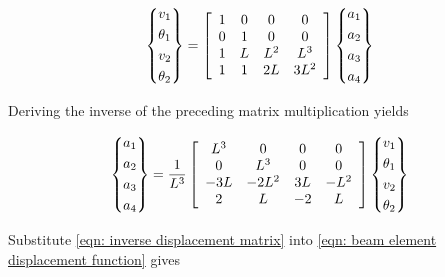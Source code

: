 \documentclass[
10pt,
a4paper,
openany,
svgnames,
]{book}
\begin{document}
\[\left\{ \begin{gathered}
  v_1 \hfill \\
  \theta _1 \hfill \\
  v_2 \hfill \\
  \theta _2 \hfill \\ 
\end{gathered}  \right\} = \left[ {\begin{array}{*{20}{c}}
  1 &0 &0   &0 \\ 
  0 &1 &0   &0 \\ 
  1 &L &L^2 &L^3 \\ 
  1 &1 &2L  &3L^2 
\end{array}} \right]\left\{ \begin{gathered}
  a_1 \hfill \\
  a_2 \hfill \\
  a_3 \hfill \\
  a_4 \hfill \\ 
\end{gathered}  \right\}\]

Deriving the inverse of the preceding matrix multiplication yields

\begin{equation} \label{eqn: inverse displacement matrix}
  \left\{
    \begin{gathered}
      a_1 \hfill \\
      a_2 \hfill \\
      a_3 \hfill \\
      a_4 \hfill \\ 
    \end{gathered}  \right\} = \frac{1}{L^3}\left[{
      \begin{array}{*{20}{c}}
        L^3 &0     &0  &0 \\ 
        0   &L^3   &0  &0 \\ 
        -3L &-2L^2 &3L &-L^2 \\ 
        2   &L     &-2 &L 
      \end{array}} \right]\left\{
    \begin{gathered}
      v_1 \hfill \\
      \theta_1 \hfill \\
      v_2 \hfill \\
      \theta_2 \hfill \\ 
    \end{gathered}  \right\}
\end{equation}

Substitute \cref{eqn: inverse displacement matrix} into \cref{eqn: beam element displacement function} gives
\end{document}
